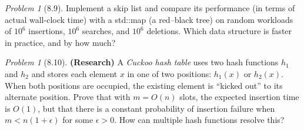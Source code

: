\documentclass[twoside,12pt]{book}
\theoremstyle{plain}
\theoremstyle{definition}
\theoremstyle{remark}
\newtheorem{problem}[theorem]{Problem}
\begin{document}
\begin{problem}[8.9]
Implement a skip list and compare its performance (in terms of actual wall-clock time) with a std::map (a red--black tree) on random workloads of $10^6$ insertions, $10^6$ searches, and $10^6$ deletions. Which data structure is faster in practice, and by how much?
\end{problem}

\begin{problem}[8.10]
\textbf{(Research)} A \emph{Cuckoo hash table} uses two hash functions $h_1$ and $h_2$ and stores each element $x$ in one of two positions: $h_1(x)$ or $h_2(x)$. When both positions are occupied, the existing element is ``kicked out'' to its alternate position. Prove that with $m = O(n)$ slots, the expected insertion time is $O(1)$, but that there is a constant probability of insertion failure when $m < n(1 + \epsilon)$ for some $\epsilon > 0$. How can multiple hash functions resolve this?
\end{problem}
\end{document}
